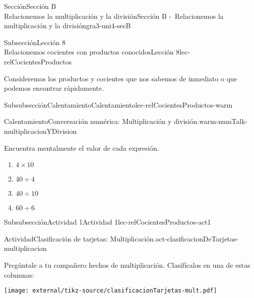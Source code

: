\begin{sectionptx}{Sección}{{\Large Sección B\\}Relacionemos la multiplicación y la división}{}{Sección B -~Relacionemos la multiplicación y la división}{}{}{gra3-uni4-secB}
%
\begin{subsectionptx}{Subsección}{{\normalsize Lección 8\\[-0.05cm]}Relacionemos cocientes con productos conocidos}{}{Lección 8}{}{}{lec-relCocientesProductos}
\begin{introduction}{}%
\vspace*{-0.3ex}
Consideremos los productos y cocientes que nos sabemos de inmediato o que podemos encontrar rápidamente.%
\end{introduction}%
\vspace*{-0.2ex}
%
%
\typeout{************************************************}
\typeout{************************************************}
%
\begin{subsubsectionptx}{Subsubsección}{Calentamiento}{}{Calentamiento}{}{}{lec-relCocientesProductos-warm}
\begin{exploration}{Calentamiento}{Conversación numérica: Multiplicación y división.}{warm-numTalk-multiplicacionYDivision}%
\vspace*{-0.6ex}
\begin{multicols}{2}
Encuentra mentalmente el valor de cada expresión.%
%
\vfill\columnbreak
\begin{enumerate}[label={\Alph*.}]
\item{}\(\displaystyle 4\times 10\)%
\item{}\(\displaystyle 40\div 4\)%
\item{}\(\displaystyle 40\div 10\)%
\item{}\(\displaystyle 60\div 6\)%
\end{enumerate}
\end{multicols}
\end{exploration}%
\end{subsubsectionptx}
%
%
\typeout{************************************************}
\typeout{************************************************}
%
\begin{subsubsectionptx}{Subsubsección}{Actividad 1}{}{Actividad 1}{}{}{lec-relCocientesProductos-act1}
\begin{activity}{Actividad}{Clasificación de tarjetas: Multiplicación.}{act-clasificacionDeTarjetas-multiplicacion}%
\begin{multicols}{2}
Pregúntale a tu compañero hechos de multiplicación. Clasifícalos en una de estas columnas:%
\vfill\columnbreak
\begin{image}{0}{1}{0}{}%
\texttt{[image: external/tikz-source/clasificacionTarjetas-mult.pdf]}

\end{image}
\end{multicols}
\end{activity}
\end{subsubsectionptx}
\end{subsectionptx}
\end{sectionptx}
